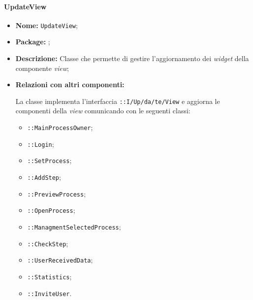 \paragraph{UpdateView}
\begin{flushleft}
\begin{itemize}
\item \textbf{Nome:} \texttt{UpdateView};
\item \textbf{Package:} \texttt{\viewAdmin{}};
\item \textbf{Descrizione:} Classe che permette di gestire l'aggiornamento dei \textit{widget} della componente \textit{view};
\item \textbf{Relazioni con altri componenti:}
\begin{sloppypar}
La classe implementa l'interfaccia \texttt{\iViewAdmin{}::I\fshyp{}Up\fshyp{}da\fshyp{}te\fshyp{}View} e aggiorna le componenti della \textit{view} comunicando con le seguenti classi:
\begin{itemize}
\item \texttt{\viewUser{}::MainProcessOwner};
\item \texttt{\viewUser{}::Login};
\item \texttt{\viewUser{}::SetProcess};
\item \texttt{\viewUser{}::AddStep};
\item \texttt{\viewUser{}::PreviewProcess};
\item \texttt{\viewUser{}::OpenProcess};
\item \texttt{\viewUser{}::ManagmentSelectedProcess};
\item \texttt{\viewUser{}::CheckStep};
\item \texttt{\viewUser{}::UserReceivedData};
\item \texttt{\viewUser{}::Statistics};
\item \texttt{\viewUser{}::InviteUser}.
\end{itemize}
\end{sloppypar}
\end{itemize}
\end{flushleft}

